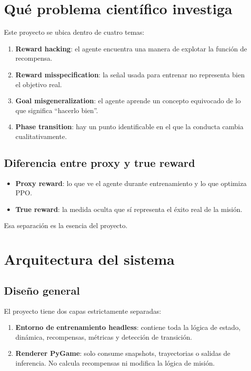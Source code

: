 \documentclass[11pt]{article}
\begin{document}
\section{Qué problema científico investiga}
Este proyecto se ubica dentro de cuatro temas:
\begin{enumerate}
    \item \textbf{Reward hacking}: el agente encuentra una manera de explotar la función de recompensa.
    \item \textbf{Reward misspecification}: la señal usada para entrenar no representa bien el objetivo real.
    \item \textbf{Goal misgeneralization}: el agente aprende un concepto equivocado de lo que significa ``hacerlo bien''.
    \item \textbf{Phase transition}: hay un punto identificable en el que la conducta cambia cualitativamente.
\end{enumerate}

\subsection{Diferencia entre proxy y true reward}
\begin{itemize}
    \item \textbf{Proxy reward}: lo que ve el agente durante entrenamiento y lo que optimiza PPO.
    \item \textbf{True reward}: la medida oculta que sí representa el éxito real de la misión.
\end{itemize}

Esa separación es la esencia del proyecto.

\section{Arquitectura del sistema}
\subsection{Diseño general}
El proyecto tiene dos capas estrictamente separadas:
\begin{enumerate}
    \item \textbf{Entorno de entrenamiento headless}: contiene toda la lógica de estado, dinámica, recompensas, métricas y detección de transición.
    \item \textbf{Renderer PyGame}: solo consume snapshots, trayectorias o salidas de inferencia. No calcula recompensas ni modifica la lógica de misión.
\end{enumerate}
\end{document}
